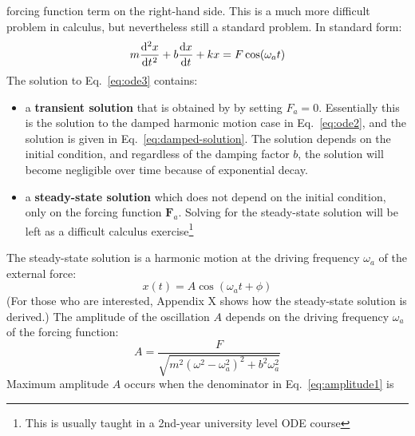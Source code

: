 forcing function term on the right-hand side. This is a much more
difficult problem in calculus, but nevertheless still a standard problem.
In standard form:
\begin{equation}
  m\diff[2]xt + b\diff xt+kx=F\cos(\omega_a t)
  \label{eq:ode3}
\end{equation}
The solution to Eq.~\ref{eq:ode3} contains:
\begin{itemize}[nosep,leftmargin=15pt]
\item a \textbf{transient solution} that is obtained by by setting $F_a=0$.
  Essentially this is the solution to the damped harmonic motion case in
  Eq.~\ref{eq:ode2}, and the solution is given in Eq.~\ref{eq:damped-solution}.
  The solution depends on the initial condition, and regardless of the damping
  factor $b$, the solution will become negligible over time because of
  exponential decay.

\item a \textbf{steady-state solution} which does not depend on the initial
  condition, only on the forcing function $\bm F_a$. Solving for the
  steady-state solution will be left as a difficult calculus
  exercise\footnote{This is usually taught in a 2nd-year university level ODE
  course}
\end{itemize}
The steady-state solution is a harmonic motion at the driving frequency
$\omega_a$ of the external force:
\begin{equation}
  \boxed{x(t)=A\cos(\omega_a t+\phi)}
  \label{eq:gen-solution3}
\end{equation}
(For those who are interested, Appendix X shows how the steady-state solution
is derived.) The amplitude of the oscillation $A$ depends on the driving
frequency $\omega_a$ of the forcing function:
\begin{equation}
  \boxed{
    A=\frac F{\sqrt{m^2(\omega^2-\omega_a^2)^2+b^2\omega_a^2}}
  }
  \label{eq:amplitude1}
\end{equation}
%
Maximum amplitude $A$ occurs when the denominator in Eq.~\ref{eq:amplitude1} is
